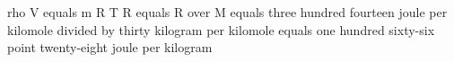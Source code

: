 rho V equals m R T  
R equals R over M equals three hundred fourteen joule per kilomole divided by thirty kilogram per kilomole equals one hundred sixty-six point twenty-eight joule per kilogram
